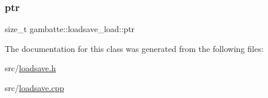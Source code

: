 \mbox{\label{classgambatte_1_1loadsave__load_ab49af43a813936002e9adb21103beae8}} 
\subsubsection{\texorpdfstring{ptr}{ptr}}
{\footnotesize\ttfamily size\+\_\+t gambatte\+::loadsave\+\_\+load\+::ptr\hspace{0.3cm}{\ttfamily [private]}}



The documentation for this class was generated from the following files\+:\begin{DoxyCompactItemize}
\item 
src/\hyperlink{loadsave_8h}{loadsave.\+h}\item 
src/\hyperlink{loadsave_8cpp}{loadsave.\+cpp}\end{DoxyCompactItemize}
